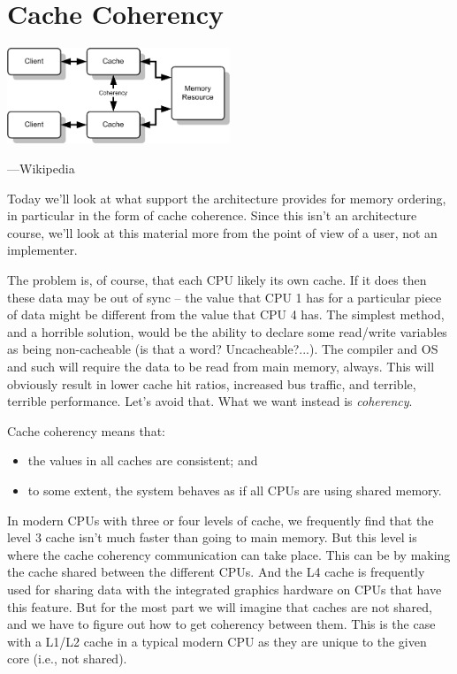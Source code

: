 




\section*{Cache Coherency}

\begin{center}
    \includegraphics[width=0.5\textwidth]{images/coherency}

\hfill ---Wikipedia
\end{center}

Today we'll look at what support the architecture provides for memory ordering, in
particular in the form of cache coherence. Since this isn't an
architecture course, we'll look at this material more from the point
of view of a user, not an implementer.

The problem is, of course, that each CPU likely its own cache. If it does then these data may be out of sync -- the value that CPU 1 has for a particular piece of data might be different from the value that CPU 4 has. The simplest method, and a horrible solution, would be the ability to declare some read/write variables as being non-cacheable (is that a word? Uncacheable?...). The compiler and OS and such will require the data to be read from main memory, always. This will obviously result in lower cache hit ratios, increased bus traffic, and terrible, terrible performance. Let's avoid that. What we want instead is \textit{coherency}.

Cache coherency means that:
  \begin{itemize}
    \item the values in all caches are consistent; and
    \item to some extent, the system behaves as if all CPUs are using shared memory.
  \end{itemize}
  
In modern CPUs with three or four levels of cache, we frequently find that the level 3 cache isn't much faster than going to main memory. But this level is where the cache coherency communication can take place. This can be by making the cache shared between the different CPUs. And the L4 cache is frequently used for sharing data with the integrated graphics hardware on CPUs that have this feature. But for the most part we will imagine that caches are not shared, and we have to figure out how to get coherency between them. This is the case with a L1/L2 cache in a typical modern CPU as they are unique to the given core (i.e., not shared).
  
